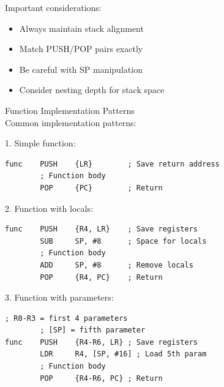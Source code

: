 \begin{remark}
Important considerations:
\begin{itemize}
  \item Always maintain stack alignment
  \item Match PUSH/POP pairs exactly
  \item Be careful with SP manipulation
  \item Consider nesting depth for stack space
\end{itemize}
\end{remark}

\begin{KR}{Function Implementation Patterns}\\
Common implementation patterns:

1. Simple function:
\begin{lstlisting}[language=armasm, style=basesmol]
func    PUSH    {LR}        ; Save return address
        ; Function body
        POP     {PC}        ; Return
\end{lstlisting}

2. Function with locals:
\begin{lstlisting}[language=armasm, style=basesmol]
func    PUSH    {R4, LR}    ; Save registers
        SUB     SP, #8      ; Space for locals
        ; Function body
        ADD     SP, #8      ; Remove locals
        POP     {R4, PC}    ; Return
\end{lstlisting}

3. Function with parameters:
\begin{lstlisting}[language=armasm, style=basesmol]
        ; R0-R3 = first 4 parameters
        ; [SP] = fifth parameter
func    PUSH    {R4-R6, LR} ; Save registers
        LDR     R4, [SP, #16] ; Load 5th param
        ; Function body
        POP     {R4-R6, PC} ; Return
\end{lstlisting}
\end{KR}



